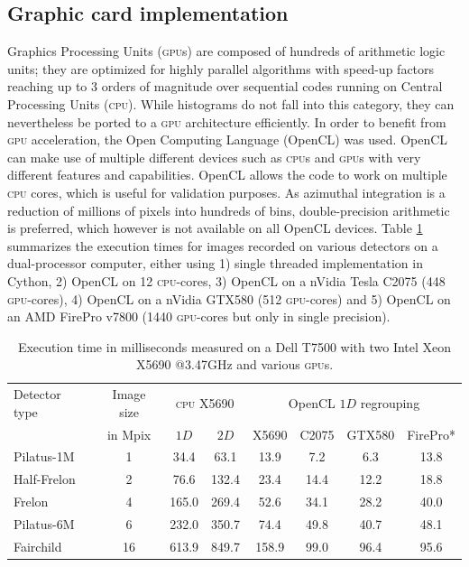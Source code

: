 \documentclass[a4paper]{jpconf}
\begin{document}
\subsection{Graphic card implementation}
Graphics Processing Units (\textsc{gpu}s) are composed of hundreds of
arithmetic logic units; they are optimized for highly
parallel algorithms with speed-up factors reaching up to 3 orders of magnitude
over sequential codes running on Central Processing Units (\textsc{cpu}).
While histograms do not fall into this category, they can nevertheless be
ported to a \textsc{gpu} architecture efficiently.
In order to benefit from \textsc{gpu} acceleration,
the Open Computing Language\cite{opencl} (OpenCL) was used. OpenCL can make use
of multiple different devices such as \textsc{cpu}s and \textsc{gpu}s with very
different features and capabilities.
OpenCL allows the code to work on multiple \textsc{cpu} cores, which is 
useful for validation purposes.
As azimuthal integration is a reduction
of millions of pixels into hundreds of bins, double-precision arithmetic is
preferred, which however is not available on all OpenCL devices.
Table \ref{perfs} summarizes the execution times for images recorded on 
various detectors on a dual-processor computer, either using 
1) single threaded implementation in Cython,
2) OpenCL on 12 \textsc{cpu}-cores,
3) OpenCL on a nVidia Tesla C2075 (448 \textsc{gpu}-cores),
4) OpenCL on a nVidia GTX580 (512 \textsc{gpu}-cores) and
5) OpenCL on an AMD FirePro v7800 (1440 \textsc{gpu}-cores but only in single
precision).

\begin{table}[h]
\caption{\label{perfs}Execution time in milliseconds measured on a
Dell T7500 with two Intel Xeon X5690 @3.47GHz and various \textsc{gpu}s.}
\vspace{1mm}
\begin{center}
\begin{tabular}{|l|c||c|c||c|c|c|c|}
\hline
Detector type   & Image size 	& \multicolumn{2}{|c||}{\textsc{cpu} X5690}& \multicolumn{4}{|c|}{OpenCL $1D$ regrouping} \\
					& in Mpix		& $1D$	&	$2D$	&	X5690	&	C2075	&	GTX580	&	FirePro* \\
\hline
Pilatus-1M 			& 1  			& 34.4  &	63.1	&	13.9	&	7.2		&	6.3		&	13.8 \\
Half-Frelon 		& 2  			& 76.6  &   132.4   &	23.4	&	14.4	&	12.2	&	18.8 \\
Frelon 				& 4  			& 165.0	&	269.4   &	52.6	&	34.1	&	28.2	&	40.0 \\
Pilatus-6M 			& 6  			& 232.0	&	350.7	&	74.4	&	49.8	&	40.7	&	48.1 \\
Fairchild 			& 16 			& 613.9	&	849.7   &	158.9	&	99.0	&	96.4	&	95.6 \\
\hline
\end{tabular}
\end{center}
\end{table}
\end{document}

